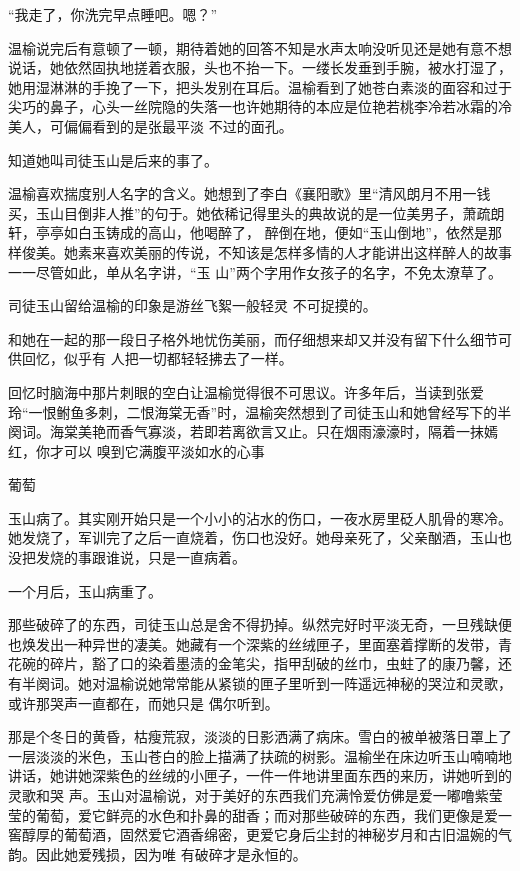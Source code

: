 \documentclass{article}
\begin{document}
“我走了，你洗完早点睡吧。嗯？” 

温榆说完后有意顿了一顿，期待着她的回答不知是水声太响没听见还是她有意不想说话，她依然固执地搓着衣服，头也不抬一下。一缕长发垂到手腕，被水打湿了，她用湿淋淋的手挽了一下，把头发别在耳后。温榆看到了她苍白素淡的面容和过于尖巧的鼻子，心头一丝院隐的失落一也许她期待的本应是位艳若桃李冷若冰霜的冷美人，可偏偏看到的是张最平淡
不过的面孔。 


知道她叫司徒玉山是后来的事了。 

温榆喜欢揣度别人名字的含义。她想到了李白《襄阳歌》里“清风朗月不用一钱买，玉山目倒非人推”的句于。她依稀记得里头的典故说的是一位美男子，萧疏朗轩，亭亭如白玉铸成的高山，他喝醉了，
\newpage
醉倒在地，便如“玉山倒地”，依然是那样俊美。她素来喜欢美丽的传说，不知该是怎样多情的人才能讲出这样醉人的故事一一尽管如此，单从名字讲，“玉
山”两个字用作女孩子的名字，不免太潦草了。 

司徒玉山留给温榆的印象是游丝飞絮一般轻灵
不可捉摸的。 

和她在一起的那一段日子格外地忧伤美丽，而仔细想来却又并没有留下什么细节可供回忆，似乎有
人把一切都轻轻拂去了一样。 

回忆时脑海中那片刺眼的空白让温榆觉得很不可思议。许多年后，当读到张爱玲“一恨鲋鱼多刺，二恨海棠无香”时，温榆突然想到了司徒玉山和她曾经写下的半阕词。海棠美艳而香气寡淡，若即若离欲言又止。只在烟雨濠濠时，隔着一抹嫣红，你才可以
嗅到它满腹平淡如水的心事 


葡萄 

\newpage

玉山病了。其实刚开始只是一个小小的沾水的伤口，一夜水房里砭人肌骨的寒冷。她发烧了，军训完了之后一直烧着，伤口也没好。她母亲死了，父亲酗酒，玉山也没把发烧的事跟谁说，只是一直病着。


一个月后，玉山病重了。 

那些破碎了的东西，司徒玉山总是舍不得扔掉。纵然完好时平淡无奇，一旦残缺便也焕发出一种异世的凄美。她藏有一个深紫的丝绒匣子，里面塞着撑断的发带，青花碗的碎片，豁了口的染着墨渍的金笔尖，指甲刮破的丝巾，虫蛀了的康乃馨，还有半阕词。她对温榆说她常常能从紧锁的匣子里听到一阵遥远神秘的哭泣和灵歌，或许那哭声一直都在，而她只是
偶尔听到。 

那是个冬日的黄昏，枯瘦荒寂，淡淡的日影洒满了病床。雪白的被单被落日罩上了一层淡淡的米色，玉山苍白的脸上描满了扶疏的树影。温榆坐在床边听玉山喃喃地讲话，她讲她深紫色的丝绒的小匣子，一件一件地讲里面东西的来历，讲她听到的灵歌和哭
\newpage
声。玉山对温榆说，对于美好的东西我们充满怜爱仿佛是爱一嘟噜紫莹莹的葡萄，爱它鲜亮的水色和扑鼻的甜香；而对那些破碎的东西，我们更像是爱一窖醇厚的葡萄酒，固然爱它酒香绵密，更爱它身后尘封的神秘岁月和古旧温婉的气韵。因此她爱残损，因为唯
有破碎才是永恒的。 
\end{document}
